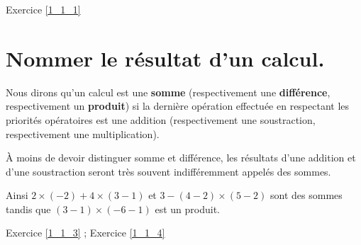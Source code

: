 \begin{exec}
\hspace{0.5cm} \hypertarget{Ex_1_1_1}{} Exercice \ref{1_1_1} \hspace{0.5cm}
\end{exec}

\section{Nommer le résultat d'un calcul.}

\begin{defi}{}{}
Nous dirons qu'un calcul est une \textbf{somme} (respectivement une \textbf{différence}, respectivement un \textbf{produit}) si la dernière opération effectuée en respectant les priorités opératoires est une addition (respectivement une soustraction, respectivement une multiplication).
\end{defi}
\medskip

À moins de devoir distinguer somme et différence, les résultats d'une addition et d'une soustraction seront très souvent indifféremment appelés des sommes.

\begin{ex}{}{}
Ainsi \quad $2\times(-2) +4\times (3-1)$ \quad et \quad $3-(4-2)\times (5-2)$ \quad sont des sommes tandis que \quad $(3-1)\times (-6-1)$ \quad est un produit.
\end{ex}

\begin{exec}
\hspace{0.5cm} \hypertarget{Ex_1_1_3}{} Exercice \ref{1_1_3} \hspace{0.5cm};
\hspace{0.5cm} \hypertarget{Ex_1_1_4}{} Exercice \ref{1_1_4} \hspace{0.5cm}
\end{exec}